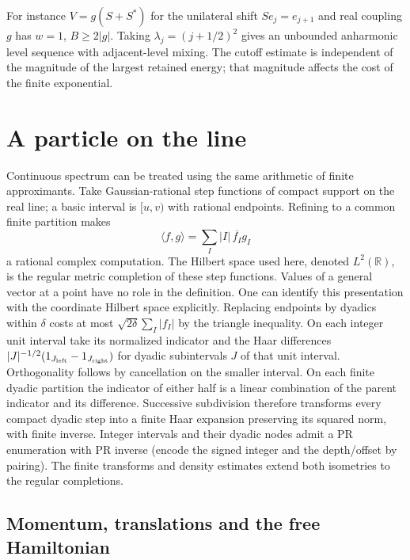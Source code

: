 For instance $V=g(S+S^*)$ for the unilateral shift $Se_j=e_{j+1}$
and real coupling $g$ has $w=1$, $B\ge2|g|$. Taking
$\lambda_j=(j+1/2)^2$ gives an unbounded anharmonic level sequence
with adjacent-level mixing. The cutoff estimate is independent of the
magnitude of the largest retained energy; that magnitude affects the
cost of the finite exponential.

\section{A particle on the line}
\label{sec:particle}

Continuous spectrum can be treated using the same arithmetic of finite
approximants. Take Gaussian-rational step functions of compact support on
the real line; a basic interval is $[u,v)$ with rational endpoints.
Refining to a common finite partition makes
\[
 \langle f,g\rangle=\sum_I |I|\,\overline{f_I}g_I
\]
a rational complex computation. The Hilbert space used here, denoted
$L^2(\mathbb R)$, is the regular metric completion of these step functions.
Values of a general vector at a point have no role in the definition.
One can identify this presentation with the coordinate Hilbert space
explicitly. Replacing endpoints by dyadics within $\delta$ costs at most
$\sqrt{2\delta}\sum_I|f_I|$ by the triangle inequality. On each integer
unit interval take its normalized indicator and the Haar differences
$|J|^{-1/2}(1_{J_{\rm left}}-1_{J_{\rm right}})$ for dyadic subintervals
$J$ of that unit interval. Orthogonality follows by cancellation on the
smaller interval. On each finite dyadic partition the indicator of either
half is a linear combination of the parent indicator and its difference.
Successive subdivision therefore transforms every compact dyadic step
into a finite Haar expansion preserving its squared norm, with finite
inverse. Integer intervals and their dyadic nodes admit a PR enumeration
with PR inverse (encode the signed integer and the depth/offset by pairing).
The finite transforms and density estimates extend both isometries to
the regular completions.

\subsection{Momentum, translations and the free Hamiltonian}

